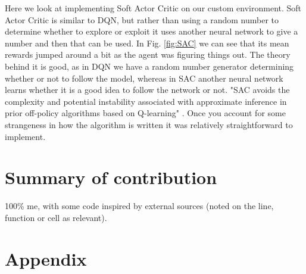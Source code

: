 \documentclass[a4pape, 11pt, english]{article}
\begin{document}
Here we look at implementing Soft Actor Critic on our custom environment. Soft Actor Critic is similar to DQN, but rather than using a random number to determine whether to explore or exploit it uses another neural network to give a number and then that can be used. In Fig. \ref{fig:SAC} we can see that its mean rewards jumped around a bit as the agent was figuring things out. The theory behind it is good, as in DQN we have a random number generator determining whether or not to follow the model, whereas in SAC another neural network learns whether it is a good idea to follow the network or not. "SAC avoids the complexity and potential instability associated with approximate inference in prior off-policy algorithms based on Q-learning" \citep[p. 2]{haarnoja_soft_2018}. Once you account for some strangeness in how the algorithm is written it was relatively straightforward to implement.

\section{Summary of contribution}
100\% me, with some code inspired by external sources (noted on the line, function or cell as relevant).



\section{Appendix}

%









\end{document}
